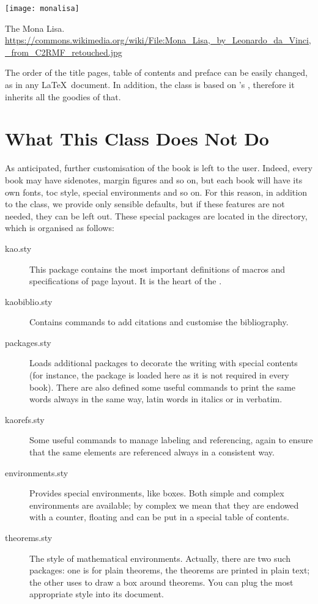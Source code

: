 \begin{marginfigure}[-5.5cm]
	\texttt{[image: monalisa]}
	\caption[The Mona Lisa]{The Mona Lisa.\\ 
	\url{https://commons.wikimedia.org/wiki/File:Mona_Lisa,_by_Leonardo_da_Vinci,_from_C2RMF_retouched.jpg}}
\end{marginfigure}

The order of the title pages, table of contents and preface can be 
easily changed, as in any \LaTeX\ document. In addition, the class is 
based on \KOMAScript's , therefore it inherits all the 
goodies of that.

\section{What This Class Does Not Do}

As anticipated, further customisation of the book is left to the user. 
Indeed, every book may have sidenotes, margin figures and so on, but 
each book will have its own fonts, toc style, special environments and 
so on. For this reason, in addition to the class, we provide only 
sensible defaults, but if these features are not needed, they can be 
left out. These special packages are located in the  
directory, which is organised as follows:

\begin{description}
	\item[kao.sty] This package contains the most important definitions 
	of macros and specifications of page layout. It is the heart of the 
	.
	\item[kaobiblio.sty] Contains commands to add citations and 
	customise the bibliography.
	\item[packages.sty] Loads additional packages to decorate the 
	writing with special contents (for instance, the  
	package is loaded here as it is not required in every book). There 
	are also defined some useful commands to print the same words always 
	in the same way, \eg latin words in italics or  in 
	verbatim.
	\item[kaorefs.sty] Some useful commands to manage labeling and 
	referencing, again to ensure that the same elements are referenced 
	always in a consistent way.
	\item[environments.sty] Provides special environments, like boxes. 
	Both simple and complex environments are available; by complex we 
	mean that they are endowed with a counter, floating and can be put 
	in a special table of contents.
	\item[theorems.sty] The style of mathematical environments. 
	Actually, there are two such packages: one is for plain theorems,
	\ie the theorems are printed in plain text; the other uses 
	 to draw a box around theorems. You can plug the 
	most appropriate style into its document.
\end{description}

